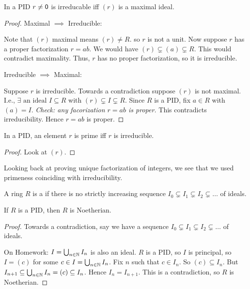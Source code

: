\documentclass[notes.tex]{subfiles}
\begin{document}
\begin{proposition}
	In a PID $r\ne \mathsf{0}$ is irreducable iff $(r)$ is a maximal ideal.
\end{proposition}

\begin{proof}
	Maximal $\implies$ Irreducible:

	Note that $(r)$ maximal means $(r)\ne R$. so $r$ is not a unit.
	Now suppose $r$ has a proper factorization $r = ab$. We would have $(r)\subsetneq(a)\subsetneq R$. This would contradict maximality. Thus, $r$ has no proper factorization, so it is irreducible.

	Irreducible $\implies$ Maximal:

	Suppose $r$ is irreducible. Towards a contradiction suppose $(r)$ is not maximal. I.e., $\exists \text{ an ideal } I\subseteq R$ with $(r) \subsetneq I \subsetneq R$. Since $R$ is a PID, fix $a\in R$ with $(a) = I$. \emph{Check: any facorization $r = ab$ is proper.}
	This contradicts irreducibility. Hence $r = ab$ is proper.
\end{proof}

\begin{corollary}
	In a PID, an element $r$ is prime iff $r$ is irreducible.
\end{corollary}
\begin{proof}
	Look at $(r)$.
\end{proof}

Looking back at proving unique factorization of integers, we see that we used primeness coinciding with irreducibility.

\begin{defn}
	A ring $R$ is a  if there is no strictly increasing sequence  $I_0\subsetneq I_1\subsetneq I_2\subsetneq \ldots$ of ideals.
\end{defn}

\begin{proposition}
	If $R$ is a PID, then $R$ is Noetherian.
\end{proposition}
\begin{proof}
	Towards a contradiction, say we have a sequence $I_0\subsetneq I_1\subsetneq I_2\subsetneq \ldots$ of ideals.

	On Homework: $I = \bigcup_{n\in\mathbb{N}}I_n$ is also an ideal. $R$ is a PID, so $I$ is principal, so $I = (c)$ for some $c\in I = \bigcup_{n\in\mathbb{N}}I_n$. Fix $n$ such that $c\in I_n$. So $(c) \subseteq I_n$. But $I_{n+1} \subseteq \bigcup_{n\in\mathbb{N}}I_n = (c) \subseteq I_n$. Hence $I_n = I_{n+1}$. This is a contradiction, so $R$ is Noetherian.
\end{proof}
\end{document}
